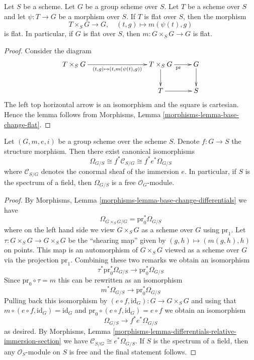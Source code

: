 \begin{lemma}
\label{lemma-flat-action-on-group-scheme}
Let $S$ be a scheme.
Let $G$ be a group scheme over $S$.
Let $T$ be a scheme over $S$ and let $\psi : T \to G$ be a morphism over $S$.
If $T$ is flat over $S$, then the morphism
$$
T \times_S G \longrightarrow G, \quad
(t, g) \longmapsto m(\psi(t), g)
$$
is flat. In particular, if $G$ is flat over $S$, then
$m : G \times_S G \to G$ is flat.
\end{lemma}

\begin{proof}
Consider the diagram
$$
\xymatrix{
T \times_S G \ar[rrr]_{(t, g) \mapsto (t, m(\psi(t), g))} & & &
T \times_S G \ar[r]_{\text{pr}} \ar[d] &
G \ar[d] \\
& & &
T \ar[r] &
S
}
$$
The left top horizontal arrow is an isomorphism and the
square is cartesian. Hence the lemma follows from
Morphisms, Lemma \ref{morphisms-lemma-base-change-flat}.
\end{proof}

\begin{lemma}
\label{lemma-group-scheme-module-differentials}
\begin{reference}
\cite[Proposition 3.15]{BookAV}
\end{reference}
Let $(G, m, e, i)$ be a group scheme over the scheme $S$.
Denote $f : G \to S$ the structure morphism.
Then there exist canonical isomorphisms
$$
\Omega_{G/S} \cong f^*\mathcal{C}_{S/G} \cong f^*e^*\Omega_{G/S}
$$
where $\mathcal{C}_{S/G}$ denotes the conormal sheaf of the
immersion $e$. In particular, if $S$ is the spectrum of a field, then
$\Omega_{G/S}$ is a free $\mathcal{O}_G$-module.
\end{lemma}

\begin{proof}
By Morphisms, Lemma \ref{morphisms-lemma-base-change-differentials} we have
$$
\Omega_{G \times_S G/G} = \text{pr}_0^*\Omega_{G/S}
$$
where on the left hand side we view $G \times_S G$ as a scheme over $G$
using $\text{pr}_1$.
Let $\tau : G \times_S G \to G \times_S G$ be the ``shearing map''
given by $(g, h) \mapsto (m(g, h), h)$ on points. This map is an automorphism
of $G \times_S G$ viewed as a scheme over $G$ via the projection $\text{pr}_1$.
Combining these two remarks we obtain an isomorphism
$$
\tau^*\text{pr}_0^*\Omega_{G/S} \to \text{pr}_0^*\Omega_{G/S}
$$
Since $\text{pr}_0 \circ \tau = m$ this can be rewritten as an isomorphism
$$
m^*\Omega_{G/S} \to \text{pr}_0^*\Omega_{G/S}
$$
Pulling back this isomorphism by
$(e \circ f, \text{id}_G) : G \to G \times_S G$
and using that $m \circ (e \circ f, \text{id}_G) = \text{id}_G$
and $\text{pr}_0 \circ (e \circ f, \text{id}_G) = e \circ f$
we obtain an isomorphism
$$
\Omega_{G/S} \to f^*e^*\Omega_{G/S}
$$
as desired. By
Morphisms, Lemma \ref{morphisms-lemma-differentials-relative-immersion-section}
we have $\mathcal{C}_{S/G} \cong e^*\Omega_{G/S}$.
If $S$ is the spectrum of a field, then
any $\mathcal{O}_S$-module on $S$ is free
and the final statement follows.
\end{proof}

